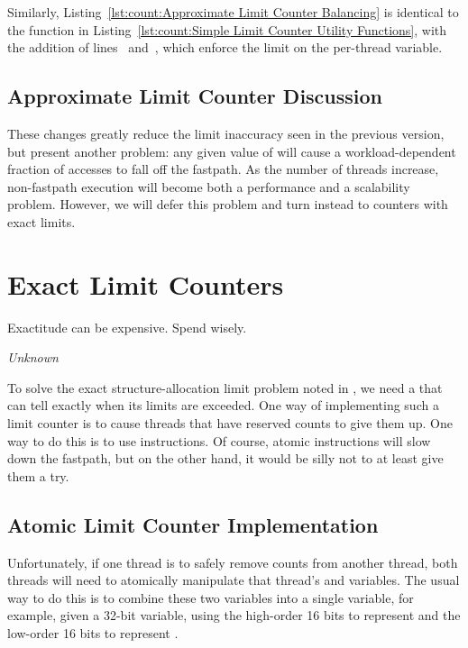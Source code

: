 \begin{fcvref}
Similarly,
Listing~\ref{lst:count:Approximate Limit Counter Balancing}
is identical to the  function in
Listing~\ref{lst:count:Simple Limit Counter Utility Functions},
with the addition of
lines~ and~, which enforce the
 limit on the per-thread  variable.
\end{fcvref}

\subsection{Approximate Limit Counter Discussion}

These changes greatly reduce the limit inaccuracy seen in the previous version,
but present another problem: any given value of 
will cause a workload-dependent fraction of accesses to fall off the
fastpath.
As the number of threads increase, non-fastpath execution will become both
a performance and a scalability problem.
However, we will defer this problem and turn instead to counters
with exact limits.

\section{Exact Limit Counters}
\label{sec:count:Exact Limit Counters}
%
\epigraph{Exactitude can be expensive.  Spend wisely.}{\emph{Unknown}}

To solve the exact structure-allocation limit problem noted in
\QuickQuizRef{\QcountQexactcnt},
we need a 
that can tell exactly when its limits are
exceeded.
One way of implementing such a limit counter is to
cause threads that have reserved counts to give them up.
One way to do this is to use  instructions.
Of course, atomic instructions will slow down the fastpath, but on the
other hand, it would be silly not to at least give them a try.

\subsection{Atomic Limit Counter Implementation}
\label{sec:count:Atomic Limit Counter Implementation}

Unfortunately,
if one thread is to safely remove counts from another thread,
both threads will need to atomically manipulate that thread's
 and  variables.
The usual way to do this is to combine these two variables into a
single variable,
for example, given a 32-bit variable, using the high-order 16 bits to
represent  and the low-order 16 bits to represent
.

